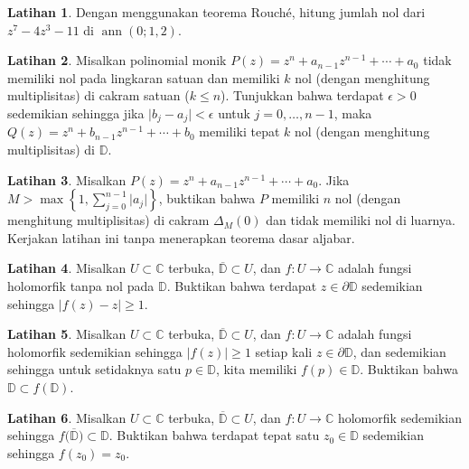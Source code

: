 \documentclass[12pt,openany]{book}
\newcommand{\ann}{\operatorname{ann}}
\newcommand{\sabs}[1]{\lvert {#1} \rvert}
\newcommand{\C}{{\mathbb{C}}}
\newcommand{\D}{{\mathbb{D}}}
\theoremstyle{plain}
\theoremstyle{remark}
\theoremstyle{definition}
\newenvironment{exbox}{%
    \def\FrameCommand{\vrule width 1pt \relax\hspace{10pt}}%
    \MakeFramed{\advance\hsize-\width\FrameRestore}%
}{%
    \endMakeFramed
}
\theoremstyle{exercise}
\newtheorem{exercise}{Latihan}[section]
\theoremstyle{example}
\begin{document}
\begin{exbox}
\begin{exercise}
Dengan menggunakan teorema Rouch\'e, hitung jumlah nol dari $z^7-4z^3-11$ di $\ann(0;1,2)$.
\end{exercise}

\begin{exercise}
Misalkan 
polinomial monik
$P(z) = z^n + a_{n-1} z^{n-1} + \cdots + a_0$
tidak memiliki nol pada lingkaran satuan dan memiliki $k$ nol
(dengan menghitung multiplisitas)
di cakram satuan ($k \leq n$).  Tunjukkan bahwa terdapat $\epsilon > 0$ sedemikian sehingga
jika $\sabs{b_j-a_j} < \epsilon$ untuk $j=0,\ldots,n-1$, maka
$Q(z) = z^n + b_{n-1} z^{n-1} + \cdots + b_0$ memiliki
tepat $k$ nol (dengan menghitung multiplisitas) di $\D$.
\end{exercise}

\begin{exercise}
Misalkan 
$P(z) = z^n + a_{n-1} z^{n-1} + \cdots + a_0$.
Jika $M > \max\left\{ 1, \sum_{j=0}^{n-1} \sabs{a_j} \right\}$,
buktikan bahwa $P$ memiliki $n$ nol (dengan menghitung multiplisitas) di cakram $\Delta_M(0)$
dan tidak memiliki nol di luarnya.  Kerjakan latihan ini tanpa menerapkan teorema dasar
aljabar.
\end{exercise}

\begin{exercise}
Misalkan $U \subset \C$ terbuka, $\overline{\D} \subset U$,
dan $f \colon U \to \C$ adalah fungsi holomorfik tanpa nol pada
$\D$.  Buktikan bahwa terdapat $z \in \partial \D$
sedemikian sehingga $\sabs{f(z)-z} \geq 1$.
\end{exercise}

\begin{exercise}
Misalkan $U \subset \C$ terbuka, $\overline{\D} \subset U$,
dan $f \colon U \to \C$ adalah fungsi holomorfik sedemikian
sehingga $\sabs{f(z)} \geq 1$ setiap kali $z \in \partial \D$,
dan sedemikian sehingga untuk setidaknya satu $p \in \D$, kita memiliki $f(p) \in \D$.
Buktikan bahwa $\D \subset f(\D)$.
\end{exercise}

\begin{exercise}
Misalkan $U \subset \C$ terbuka, $\overline{\D} \subset U$,
dan $f \colon U \to \C$ holomorfik sedemikian
sehingga $f\bigl(\overline{\D}\bigr) \subset \D$.
Buktikan bahwa terdapat
tepat satu $z_0 \in \D$ sedemikian sehingga $f(z_0) = z_0$.
\end{exercise}
\end{exbox}
\end{document}
